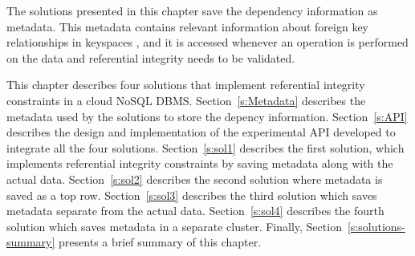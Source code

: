 The solutions presented in this chapter save the dependency information as
metadata. This metadata contains relevant  information about  foreign
key relationships in keyspaces , and it is
accessed whenever an operation is performed on the data and referential
integrity needs to be validated. 


This chapter describes  four  solutions  that implement referential
integrity constraints in a cloud \ac{NoSQL} \ac{DBMS}.
Section~\ref{s:Metadata} describes the metadata used by the solutions 
 to store the depency information.
Section~\ref{s:API} describes the design and implementation of the experimental
API developed to integrate all the four
solutions. 
Section~\ref{s:sol1} describes  the first solution, which implements
referential integrity constraints by saving metadata along with the actual data.
Section~\ref{s:sol2} describes the second  solution where metadata is
saved as a top row. Section~\ref{s:sol3} describes the third   
solution which saves metadata separate from the actual data.   
Section~\ref{s:sol4}  describes the fourth solution which saves metadata in a separate cluster.
Finally, Section~\ref{s:solutions-summary} presents a brief summary of this
chapter. 

